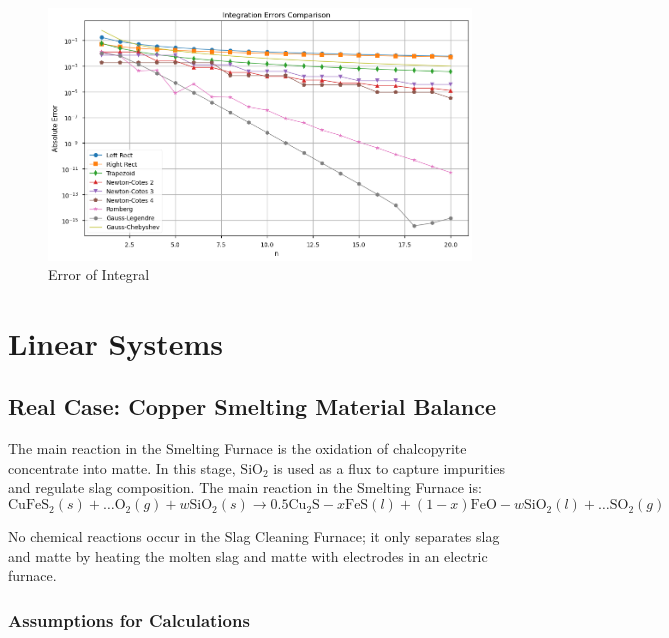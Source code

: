 \documentclass[10pt]{article}
\begin{document}
\begin{figure}[H]
    \centering
    \label{fig:integration_errors}
    \includegraphics[width=\imagewidth\textwidth]{figures/04_int&diff/integration_errors.png}
    \caption{Error of Integral}
\end{figure}






\section{Linear Systems}
\subsection{Real Case: Copper Smelting Material Balance}






The main reaction in the Smelting Furnace is the oxidation of chalcopyrite concentrate into matte. In this stage, $\text{SiO}_2$ is used as a flux to capture impurities and regulate slag composition. The main reaction in the Smelting Furnace is:
$$
\text{CuFeS}_2(s) + \dots \text{O}_2(g) + w\text{SiO}_2(s) \rightarrow 0.5\text{Cu}_2\text{S} - x\text{FeS}(l) + (1 - x)\text{FeO} - w\text{SiO}_2(l) + \dots \text{SO}_2(g)
$$

No chemical reactions occur in the Slag Cleaning Furnace; it only separates slag and matte by heating the molten slag and matte with electrodes in an electric furnace.

\subsubsection{Assumptions for Calculations}
\end{document}
